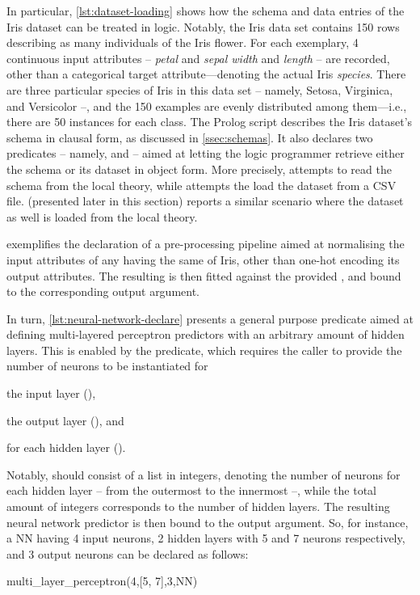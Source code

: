 \documentclass[
]{ceurart}
\begin{document}
In particular, \cref{lst:dataset-loading} shows how the schema and data entries of the Iris dataset can be treated in logic.
%
Notably, the Iris data set contains 150 rows describing as many individuals of the Iris flower.
%
For each exemplary, 4 continuous input attributes -- \emph{petal} and \emph{sepal width} and \emph{length} -- are recorded, other than a categorical target attribute---denoting the actual Iris \emph{species}.
%
There are three particular species of Iris in this data set -- namely, Setosa, Virginica, and Versicolor --, and the 150 examples are evenly distributed among them---i.e., there are 50 instances for each class.
%
The Prolog script describes the Iris dataset's schema in clausal form, as discussed in \cref{ssec:schemas}.
%
It also declares two predicates -- namely,  and  -- aimed at letting the logic programmer retrieve either the schema or its dataset in object form.
%
More precisely,  attempts to read the schema from the local theory, while  attempts the load the dataset from a CSV file.
%
 (presented later in this section) reports a similar scenario where the dataset as well is loaded from the local theory.

 exemplifies the declaration of a pre-processing pipeline aimed at normalising the input attributes of any  having the same  of Iris, other than one-hot encoding its output attributes.
%
The resulting  is then fitted against the provided , and bound to the corresponding output argument.

In turn, \cref{lst:neural-network-declare} presents a general purpose predicate aimed at defining multi-layered perceptron predictors with an arbitrary amount of hidden layers.
%
This is enabled by the  predicate, which requires the caller to provide the number of neurons to be instantiated for
%
\begin{inlinelist}
    \item the input layer (),
    \item the output layer (), and
    \item for each hidden layer ().
\end{inlinelist}
%
Notably,  should consist of a list in integers, denoting the number of neurons for each hidden layer -- from the outermost to the innermost --, while the total amount of integers corresponds to the number of hidden layers.
%
The resulting neural network predictor is then bound to the  output argument.
%
So, for instance, a NN having 4 input neurons, 2 hidden layers with 5 and 7 neurons respectively, and 3 output neurons can be declared as follows:
%
\begin{lp}
    multi\_layer\_perceptron(4,[5, 7],3,NN)
\end{lp}
\end{document}
